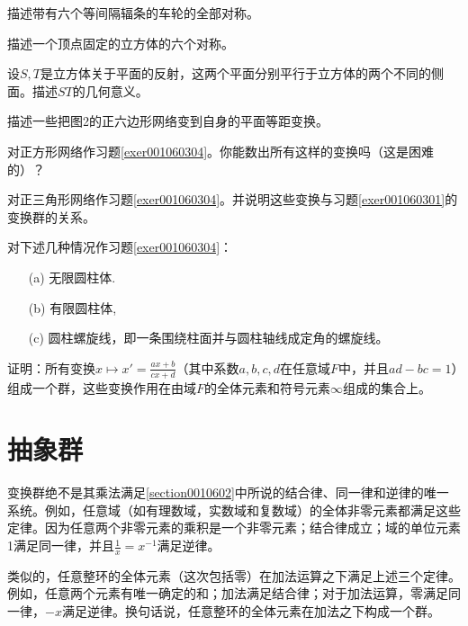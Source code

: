 \begin{problemset}
\item\label{exer001060301} 描述带有六个等间隔辐条的车轮的全部对称。

\item\label{exer001060302} 描述一个顶点固定的立方体的六个对称。

\item\label{exer001060303} 设$S, T$是立方体关于平面的反射，这两个平面分别平行于立方体的两个不同的侧面。描述$ST$的几何意义。

\item\label{exer001060304} 描述一些把图2的正六边形网络变到自身的平面等距变换。

\item\label{exer001060305} 对正方形网络作习题\ref{exer001060304}。你能数出所有这样的变换吗（这是困难的）？

\item\label{exer001060306} 对正三角形网络作习题\ref{exer001060304}。并说明这些变换与习题\ref{exer001060301}的变换群的关系。

\item\label{exer001060307} 对下述几种情况作习题\ref{exer001060304}：
\begin{enumerate}
\item[(a)]无限圆柱体.
\item[(b)]有限圆柱体,
\item[(c)]圆柱螺旋线，即一条围绕柱面并与圆柱轴线成定角的螺旋线。
\end{enumerate}

\item 证明：所有变换$x \mapsto x'=\frac{ax+b}{cx+d}$（其中系数$a,b,c,d$在任意域$F$中，并且$ad-bc=1$）组成一个群，这些变换作用在由域$F$的全体元素和符号元素$\infty$组成的集合上。
\end{problemset}


\section{抽象群}\label{section0010604}
变换群绝不是其乘法满足\ref{section0010602}中所说的结合律、同一律和逆律的唯一系统。例如，任意域（如有理数域，实数域和复数域）的全体非零元素都满足这些定律。因为任意两个非零元素的乘积是一个非零元素；结合律成立；域的单位元素1满足同一律，并且$\frac{1}{x} = x^{-1}$满足逆律。

类似的，任意整环的全体元素（这次包括零）在加法运算之下满足上述三个定律。例如，任意两个元素有唯一确定的和；加法满足结合律；对于加法运算，零满足同一律，$-x$满足逆律。换句话说，任意整环的全体元素在加法之下构成一个群。

